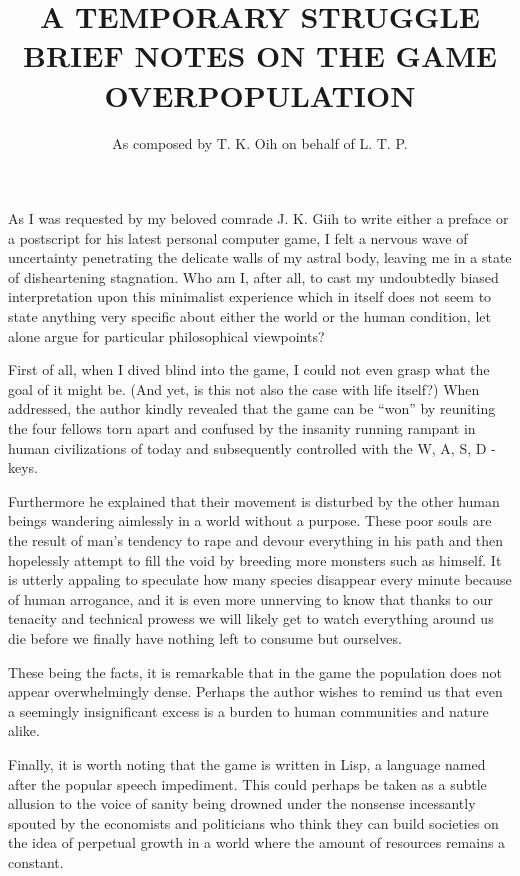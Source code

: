 \documentclass[12pt]{article}
\title{A TEMPORARY STRUGGLE \\ \vspace{4 mm} {\normalsize BRIEF NOTES ON THE GAME OVERPOPULATION}}
\author{As composed by T. K. Oih on behalf of L. T. P.}
\date{}
\begin{document}
\maketitle
\thispagestyle{empty}
\onehalfspacing
\section{}As I was requested by my beloved comrade J. K. Giih to write either a preface or a postscript for his latest personal computer game, I felt a nervous wave of uncertainty penetrating the delicate walls of my astral body, leaving me in a state of disheartening stagnation. Who am I, after all, to cast my undoubtedly biased interpretation upon this minimalist experience which in itself does not seem to state anything very specific about either the world or the human condition, let alone argue for particular philosophical viewpoints?

First of all, when I dived blind into the game, I could not even grasp what the goal of it might be. (And yet, is this not also the case with life itself?) When addressed, the author kindly revealed that the game can be ``won'' by reuniting the four fellows torn apart and confused by the insanity running rampant in human civilizations of today and subsequently controlled with the W, A, S, D -keys.

Furthermore he explained that their movement is disturbed by the other human beings wandering aimlessly in a world without a purpose. These poor souls are the result of man's tendency to rape and devour everything in his path and then hopelessly attempt to fill the void by breeding more monsters such as himself. It is utterly appaling to speculate how many species disappear every minute because of human arrogance, and it is even more unnerving to know that thanks to our tenacity and technical prowess we will likely get to watch everything around us die before we finally have nothing left to consume but ourselves.

These being the facts, it is remarkable that in the game the population does not appear overwhelmingly dense. Perhaps the author wishes to remind us that even a seemingly insignificant excess is a burden to human communities and nature alike.

Finally, it is worth noting that the game is written in Lisp, a language named after the popular speech impediment. This could perhaps be taken as a subtle allusion to the voice of sanity being drowned under the nonsense incessantly spouted by the economists and politicians who think they can build societies on the idea of perpetual growth in a world where the amount of resources remains a constant.
\end{document}
